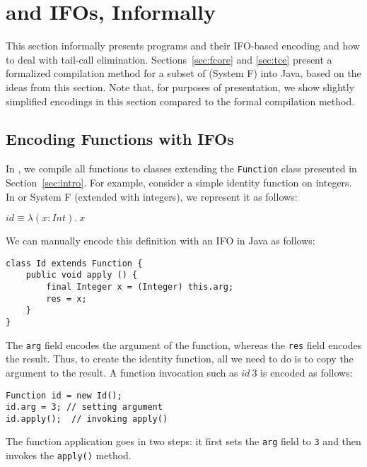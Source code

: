 \section{\name and IFOs, Informally}\label{sec:overview}

This section informally presents \name programs and their IFO-based
encoding and how to deal with tail-call elimination.
Sections~\ref{sec:fcore} and \ref{sec:tce} present a formalized
compilation method for a subset of \name (System F) into Java, based on the ideas from this section.
Note that, for purposes of presentation, we show slightly simplified encodings in this
section compared to the formal compilation method.

\subsection{Encoding Functions with IFOs}\label{subsec:ifos}

\noindent In \Name, we compile all functions to classes extending the \lstinline{Function} class presented in
Section~\ref{sec:intro}. For example, consider a simple identity
function on integers. In \name or System F (extended with integers),
we represent it as follows:

\vspace{5pt}
$id \equiv \lambda (x : Int).~x$
\vspace{5pt}

\noindent We can manually encode this definition with an IFO in Java as follows:

\begin{lstlisting}
class Id extends Function {
    public void apply () {
        final Integer x = (Integer) this.arg;
        res = x;
    }
}
\end{lstlisting}

\noindent The \lstinline{arg} field encodes the argument of the
function, whereas the \lstinline{res} field encodes the result. Thus,
to create the identity function, all we need to do is to copy the
argument to the result. A function invocation such as
$id~3$ is encoded as follows:

\begin{lstlisting}
Function id = new Id();
id.arg = 3; // setting argument
id.apply();  // invoking apply()
\end{lstlisting}

\noindent The function application goes in two steps:
it first sets the \lstinline{arg} field to \lstinline{3} and then
invokes the \lstinline{apply()} method.

